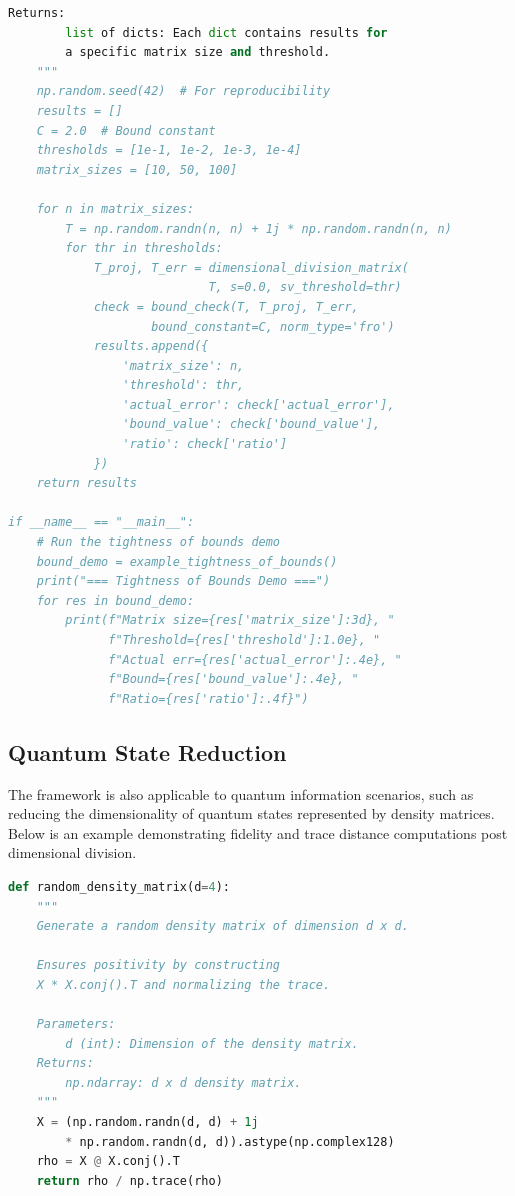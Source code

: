 \documentclass[sn-mathphys-num]{sn-jnl}
\theoremstyle{thmstyleone}
\theoremstyle{thmstyletwo}
\theoremstyle{thmstylethree}
\begin{document}
\begin{appendices}
\begin{lstlisting}[language=Python,caption={Example usage of the dimensional division framework.},label={lst:dim-division-usage}]
    Returns:
        list of dicts: Each dict contains results for 
        a specific matrix size and threshold.
    """
    np.random.seed(42)  # For reproducibility
    results = []
    C = 2.0  # Bound constant
    thresholds = [1e-1, 1e-2, 1e-3, 1e-4]
    matrix_sizes = [10, 50, 100]
    
    for n in matrix_sizes:
        T = np.random.randn(n, n) + 1j * np.random.randn(n, n)
        for thr in thresholds:
            T_proj, T_err = dimensional_division_matrix(
                            T, s=0.0, sv_threshold=thr)
            check = bound_check(T, T_proj, T_err, 
                    bound_constant=C, norm_type='fro')
            results.append({
                'matrix_size': n,
                'threshold': thr,
                'actual_error': check['actual_error'],
                'bound_value': check['bound_value'],
                'ratio': check['ratio']
            })
    return results

if __name__ == "__main__":
    # Run the tightness of bounds demo
    bound_demo = example_tightness_of_bounds()
    print("=== Tightness of Bounds Demo ===")
    for res in bound_demo:
        print(f"Matrix size={res['matrix_size']:3d}, "
              f"Threshold={res['threshold']:1.0e}, "
              f"Actual err={res['actual_error']:.4e}, "
              f"Bound={res['bound_value']:.4e}, "
              f"Ratio={res['ratio']:.4f}")
\end{lstlisting}

\subsection{Quantum State Reduction}

The framework is also applicable to quantum information scenarios, such as reducing the dimensionality of quantum states represented by density matrices. Below is an example demonstrating fidelity and trace distance computations post dimensional division.

\begin{lstlisting}[language=Python,caption={Quantum state reduction example using the dimensional division framework.},label={lst:quantum-state-reduction}]
def random_density_matrix(d=4):
    """
    Generate a random density matrix of dimension d x d.
    
    Ensures positivity by constructing 
    X * X.conj().T and normalizing the trace.
    
    Parameters:
        d (int): Dimension of the density matrix.
    Returns:
        np.ndarray: d x d density matrix.
    """
    X = (np.random.randn(d, d) + 1j 
        * np.random.randn(d, d)).astype(np.complex128)
    rho = X @ X.conj().T
    return rho / np.trace(rho)



\end{lstlisting}
\end{appendices}
\end{document}
